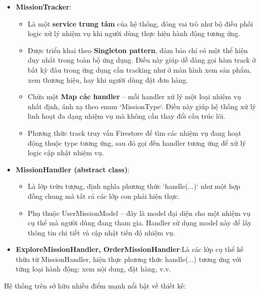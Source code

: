 \documentclass[../DoAn.tex]{subfiles}
\begin{document}
\begin{itemize}
    \item \textbf{MissionTracker}:
    \begin{itemize}
        \item Là một \textbf{service trung tâm} của hệ thống, đóng vai trò như bộ điều phối logic xử lý nhiệm vụ khi người dùng thực hiện hành động tương ứng.
        \item Được triển khai theo \textbf{Singleton pattern}, đảm bảo chỉ có một thể hiện duy nhất trong toàn bộ ứng dụng. Điều này giúp dễ dàng gọi hàm track ở bất kỳ đâu trong ứng dụng cần tracking như ở màn hình xem sản phẩm, xem thương hiệu, hay khi người dùng đặt đơn hàng.
        \item Chứa một \textbf{Map các handler} – mỗi handler xử lý một loại nhiệm vụ nhất định, ánh xạ theo enum `MissionType`. Điều này giúp hệ thống xử lý linh hoạt đa dạng nhiệm vụ mà không cần thay đổi cấu trúc lõi.
        \item Phương thức track truy vấn Firestore để tìm các nhiệm vụ đang hoạt động thuộc type tương ứng, sau đó gọi đến handler tương ứng để xử lý logic cập nhật nhiệm vụ.
    \end{itemize}

    \item \textbf{MissionHandler (abstract class)}:
    \begin{itemize}
        \item Là lớp trừu tượng, định nghĩa phương thức `handle(...)` như một hợp đồng chung mà tất cả các lớp con phải hiện thực.
      
        \item Phụ thuộc UserMissionModel – đây là model đại diện cho một nhiệm vụ cụ thể mà người dùng đang tham gia. Handler sử dụng model này để lấy thông tin chi tiết và cập nhật tiến độ nhiệm vụ.
    \end{itemize}

    \item \textbf{ExploreMissionHandler, OrderMissionHandler}:Là các lớp cụ thể kế thừa từ MissionHandler, hiện thực phương thức handle(...) tương ứng với từng loại hành động: xem nội dung, đặt hàng, v.v.
\end{itemize}

\noindent
Hệ thống trên sở hữu nhiều điểm mạnh nổi bật về thiết kế:
\end{document}
